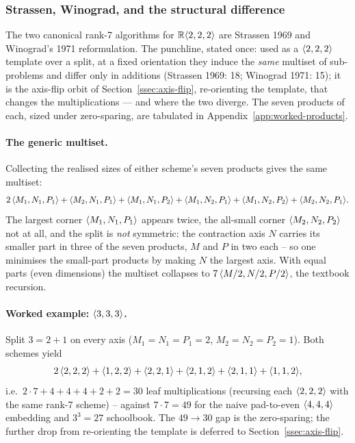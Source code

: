 \subsubsection{Strassen, Winograd, and the structural difference}
\label{ssec:strassen-vs-winograd}

The two canonical rank-7 algorithms for \(\mathbb{R}\langle 2, 2, 2 \rangle\) are Strassen 1969
and Winograd's 1971 reformulation. The punchline, stated once: used as a
\(\langle 2, 2, 2 \rangle\) template over a split, at a fixed orientation they induce the
\emph{same} multiset of sub-problems and differ only in additions (Strassen 1969: 18;
Winograd 1971: 15); it is the axis-flip orbit of Section~\ref{ssec:axis-flip},
re-orienting the template, that changes the multiplications --- and where the two diverge.
The seven products of each, sized under zero-sparing, are tabulated in
Appendix~\ref{app:worked-products}.

\paragraph{The generic multiset.}
Collecting the realised sizes of either scheme's seven products gives the same multiset:
\[
  2\,\langle M_1, N_1, P_1 \rangle + \langle M_2, N_1, P_1 \rangle + \langle M_1, N_1, P_2 \rangle
  + \langle M_1, N_2, P_1 \rangle + \langle M_1, N_2, P_2 \rangle + \langle M_2, N_2, P_1 \rangle.
\]
The largest corner \(\langle M_1, N_1, P_1 \rangle\) appears twice, the all-small corner
\(\langle M_2, N_2, P_2 \rangle\) not at all, and the split is \emph{not} symmetric: the
contraction axis \(N\) carries its smaller part in three of the seven products, \(M\) and
\(P\) in two each -- so one minimises the small-part products by making \(N\) the largest
axis. With equal parts (even dimensions) the multiset collapses to
\(7\,\langle M/2, N/2, P/2 \rangle\), the textbook recursion.

\paragraph{Worked example: \(\langle 3, 3, 3 \rangle\).}
Split \(3 = 2{+}1\) on every axis (\(M_1{=}N_1{=}P_1{=}2\), \(M_2{=}N_2{=}P_2{=}1\)). Both
schemes yield
\[
  2\,\langle 2, 2, 2 \rangle + \langle 1, 2, 2 \rangle + \langle 2, 2, 1 \rangle + \langle 2, 1, 2 \rangle
  + \langle 2, 1, 1 \rangle + \langle 1, 1, 2 \rangle,
\]
i.e.\ \(2\cdot 7 + 4 + 4 + 4 + 2 + 2 = 30\) leaf multiplications (recursing each
\(\langle 2, 2, 2 \rangle\) with the same rank-7 scheme) -- against \(7\cdot 7 = 49\) for the
naive pad-to-even \(\langle 4, 4, 4 \rangle\) embedding and \(3^3 = 27\) schoolbook. The
\(49 \to 30\) gap is the zero-sparing; the further drop from re-orienting the template is
deferred to Section~\ref{ssec:axis-flip}.

